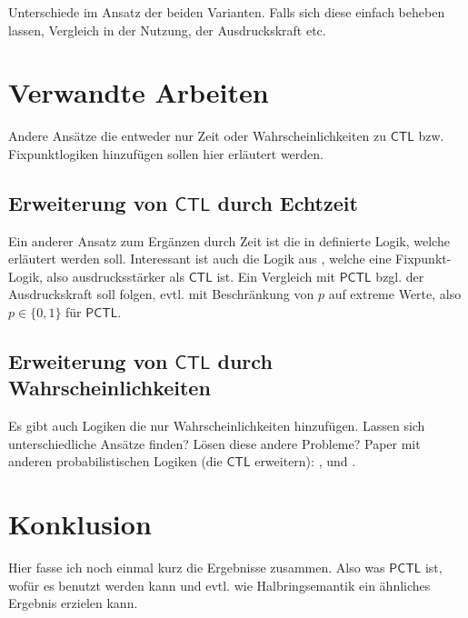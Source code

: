 \documentclass{lni}
\theoremstyle{def_style}
\theoremstyle{break}
\newcommand{\CTL}{\mathsf{CTL}}
\newcommand{\PCTL}{\mathsf{PCTL}}
\begin{document}
Unterschiede im Ansatz der beiden Varianten. Falls sich diese einfach beheben lassen, Vergleich in der Nutzung, der Ausdruckskraft etc.

\section{Verwandte Arbeiten}
\label{ChapVerwandt}

Andere Ansätze die entweder nur Zeit oder Wahrscheinlichkeiten zu $\CTL$ bzw. Fixpunktlogiken hinzufügen sollen hier erläutert werden.

\subsection{Erweiterung von $\CTL$ durch Echtzeit}

Ein anderer Ansatz zum Ergänzen durch Zeit ist die in \cite{alur1990model} definierte Logik, welche erläutert werden soll. Interessant ist auch die Logik aus \cite{jahanian1986safety}, welche eine Fixpunkt-Logik, also ausdrucksstärker als $\CTL$ ist.
Ein Vergleich mit $\PCTL$ bzgl. der Ausdruckskraft soll folgen, evtl. mit Beschränkung von $p$ auf extreme Werte, also $p\in \{0,1\}$ für $\PCTL$.

\subsection{Erweiterung von $\CTL$ durch Wahrscheinlichkeiten}

Es gibt auch Logiken die nur Wahrscheinlichkeiten hinzufügen. Lassen sich unterschiedliche Ansätze finden? Lösen diese andere Probleme? Paper mit anderen probabilistischen Logiken (die $\CTL$ erweitern): \cite{hart1984probabilistic}, \cite{lehmann1982reasoning} und \cite{christoff1992reasoning}.

\section{Konklusion}

Hier fasse ich noch einmal kurz die Ergebnisse zusammen. Also was $\PCTL$ ist, wofür es benutzt werden kann und evtl. wie Halbringsemantik ein ähnliches Ergebnis erzielen kann.


\end{document}
